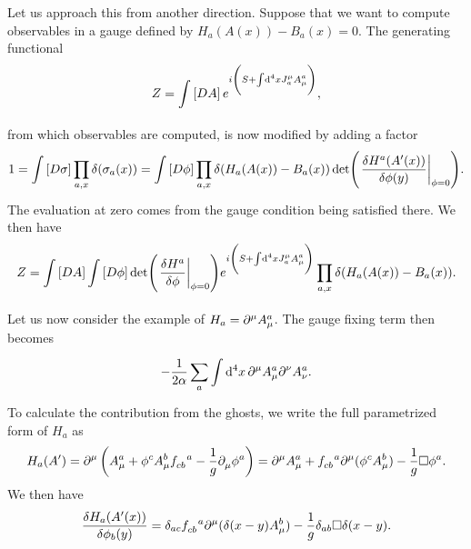Let us approach this from another direction. Suppose that we want to compute observables in a gauge defined by $H_{a}(A(x)) - B_{a}(x) = 0$. The generating functional
\begin{align*}
	Z = \int\limits_{}\left[DA\right]e^{i\left(S + \int\limits_{}^{}\dd[4]{x}J^{\mu}_{a}A^{a}_{\mu}\right)},
\end{align*}
from which observables are computed, is now modified by adding a factor
\begin{align*}
	1 = \pinte{}{\sigma}\prod\limits_{a, x}\delta(\sigma_{a}(x)) = \pinte{}{\phi}\prod\limits_{a, x}\delta(H_{a}(A(x)) - B_{a}(x))\det(\eval{\fdv{H^{a}(A\p(x))}{\phi(y)}}_{\phi = 0}).
\end{align*}
The evaluation at zero comes from the gauge condition being satisfied there. We then have
\begin{align*}
	Z = \pinte{}{A}\pinte{}{\phi}\det(\eval{\fdv{H^{a}}{\phi}}_{\phi = 0})e^{i\left(S + \integ[4]{}{}{x}{J^{\mu}_{a}A^{a}_{\mu}}\right)}\prod\limits_{a, x}\delta(H_{a}(A(x)) - B_{a}(x)).
\end{align*}

Let us now consider the example of $H_{a} = \partial^{\mu}_{}A_{\mu}^{a}$. The gauge fixing term then becomes
\begin{align*}
	-\frac{1}{2\alpha}\sum\limits_{a}\int\limits_{}^{}\dd[4]{x}\partial^{\mu}_{}A_{\mu}^{a}\partial^{\nu}_{}A_{\nu}^{a}.
\end{align*}
To calculate the contribution from the ghosts, we write the full parametrized form of $H_{a}$ as
\begin{align*}
	H_{a}(A\p) = \del{\mu}{}\left(A_{\mu}^{a} + \phi^{c}A_{\mu}^{b}\srconst{cb}{a} - \frac{1}{g}\del{}{\mu}\phi^{a}\right) = \del{\mu}{}A_{\mu}^{a} + \srconst{cb}{a}\del{\mu}{}(\phi^{c}A_{\mu}^{b}) - \frac{1}{g}\dalem\phi^{a}.
\end{align*}
We then have
\begin{align*}
	\fdv{H_{a}(A\p(x))}{\phi_{b}(y)} = \delta_{ac}\srconst{cb}{a}\del{\mu}{}(\delta(x - y)A_{\mu}^{b}) - \frac{1}{g}\delta_{ab}\dalem\delta(x - y).
\end{align*}